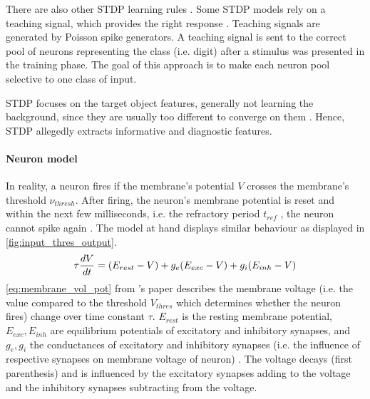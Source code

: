 There are also other \ac{STDP} learning rules \cite{SNN,STDP_random}.
Some \ac{STDP} models rely on a teaching signal, which provides the right response \cite{STDP_like}.
Teaching signals are generated by Poisson spike generators.
A teaching signal is sent to the correct pool of neurons representing the class (i.e. digit) after a stimulus was presented in the training phase.
The goal of this approach is to make each neuron pool selective to one class of input.

\ac{STDP} focuses on the target object features, generally not learning the background, since they are usually too different to converge on them \cite{multi_scale_STDP,STDP_vis_feat}.
Hence, \ac{STDP} allegedly extracts informative and diagnostic features.

\vspace{-3mm}
\paragraph{\textbf{Neuron model}}
In reality, a neuron fires if the membrane's potential $V$ crosses the membrane's threshold $\nu_{thresh}$.
After firing, the neuron's membrane potential is reset and within the next few milliseconds, i.e. the refractory period $t_{ref}$ \cite{RBM_SNN}, 
the neuron cannot spike again \cite{SNN}.
The model at hand displays similar behaviour as displayed in \autoref{fig:input_thres_output}.
%
\begin{equation}
    \centering
    \label{eq:membrane_vol_pot}
    \tau \frac{dV}{dt} = (E_{rest} - V) + g_e(E_{exc} - V) + g_i(E_{inh} - V)
\end{equation}
%
\autoref{eq:membrane_vol_pot} from \authorsSNN{}'s paper \cite{SNN} describes the membrane voltage 
(i.e. the value compared to the threshold $V_{thres}$ which determines whether the neuron fires) change over time constant $\tau$.
$E_{rest}$ is the resting membrane potential, $E_{exc}, E_{inh}$ are equilibrium potentials of excitatory and inhibitory synapses, 
and $g_e, g_i$ the conductances of excitatory and inhibitory synapses (i.e. the influence of respective synapses on membrane voltage of neuron) \cite{SNN}. 
The voltage decays (first parenthesis) and is influenced by the excitatory synapses 
adding to the voltage and the inhibitory synapses subtracting from the voltage.
%
